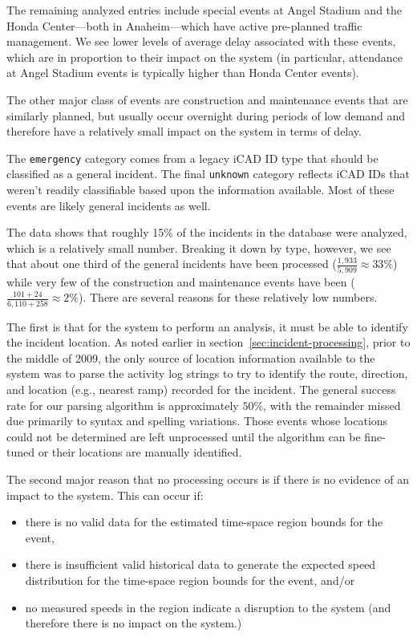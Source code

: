 \documentclass[12pt]{report}
\newcounter{time}
\newcounter{space}
\begin{document}
The remaining analyzed entries include special events at Angel Stadium and the
Honda Center---both in Anaheim---which have active pre-planned traffic
management.  We see lower levels of average delay associated with these events,
which are in proportion to their impact on the system (in particular, attendance
at Angel Stadium events is typically higher than Honda Center events).

The other major class of events are construction and maintenance events that are
similarly planned, but usually occur overnight during periods of low demand and
therefore have a relatively small impact on the system in terms of delay.

The \texttt{emergency} category comes from a legacy \ac{iCAD} ID type that
should be classified as a general incident.  The final \texttt{unknown} category
reflects \ac{iCAD} IDs that weren't readily classifiable based upon the
information available.  Most of these events are likely general incidents as
well.

The data shows that roughly 15\% of the incidents in the database were analyzed,
which is a relatively small number.  Breaking it down by type, however, we see
that about one third of the general incidents have been processed
($\frac{1,933}{5,909}\approx{}33\%$) while very few of the construction and maintenance
events have been ($\frac{101+24}{6,110+258} \approx 2\%$).  There are several
reasons for these relatively low numbers.  

The first is that for the system to perform an analysis, it must be able to
identify the incident location.  As noted earlier in
section~\ref{sec:incident-processing}, prior to the middle of 2009, the only
source of location information available to the system was to parse the activity
log strings to try to identify the route, direction, and location (e.g., nearest
ramp) recorded for the incident.  The general success rate for our parsing
algorithm is approximately $50\%$, with the remainder missed due primarily to
syntax and spelling variations.  Those events whose locations could not be
determined are left unprocessed until the algorithm can be fine-tuned or their
locations are manually identified.

The second major reason that no processing occurs is if there is no evidence of
an impact to the system.  This can occur if:
\begin{itemize}
\item there is no valid data for the estimated time-space region bounds for the event,
\item there is insufficient valid historical data to generate the expected speed
  distribution for the time-space region bounds for the event, and/or
\item no measured speeds in the region indicate a disruption to the system (and
  therefore there is no impact on the system.)
\end{itemize}
\end{document}
